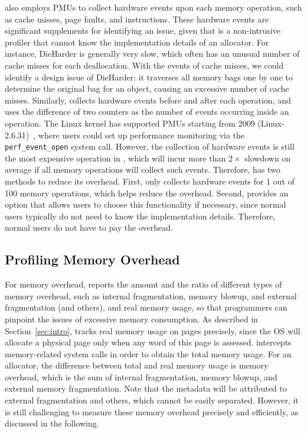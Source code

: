 \MP{} also employs PMUs to collect hardware events upon each memory operation, such as cache misses, page faults, and instructions. These hardware events are significant supplements for identifying an issue, given that \MP{} is a non-intrusive profiler that cannot know the implementation details of an allocator. For instance, DieHarder is generally very slow, which often has an unusual number of cache misses for each deallocation. With the events of cache misses, we could identify a design issue of DieHarder: it traverses all memory bags one by one to determine the original bag for an object, causing an excessive number of cache misses. Similarly, \MP{} collects hardware events before and after each operation, and uses the difference of two counters as the number of events occurring inside an operation. The Linux kernel has supported PMUs starting from 2009 (Linux-2.6.31)~\cite{pmulinuxsupport}, where users could set up performance monitoring via the \texttt{perf\_event\_open} system call. However, the collection of hardware events is still the most expensive operation in \MP{}, which will incur more than $2\times$ slowdown on average if all memory operations will collect such events. Therefore, \MP{} has two methods to reduce its overhead. First, \MP{} only collects hardware events for 1 out of 100 memory operations, which helps reduce the overhead. Second, \MP{} provides an option that allows users to choose this functionality if necessary, since normal users typically do not need to know the implementation details. Therefore, normal users do not have to pay the overhead.     


\subsection{Profiling Memory Overhead}
\label{sec:profilingmemory}

For memory overhead, \MP{} reports the amount and the ratio of different types of memory overhead, such as internal fragmentation, memory blowup, and external fragmentation (and others), and real memory usage, so that programmers can pinpoint the issues of excessive memory consumption. As described in Section~\ref{sec:intro}, \MP{} tracks real memory usage on pages precisely, since the OS will allocate a physical page only when any word of this page is assessed. \MP{} intercepts memory-related system calls in order to obtain the total memory usage. For an allocator, the difference between total and real memory usage is memory overhead, which is the sum of internal fragmentation, memory blowup, and external memory fragmentation. Note that the metadata will be attributed to external fragmentation and others, which cannot be easily separated. However, it is still challenging to measure these memory overhead precisely and efficiently, as discussed in the following. 

